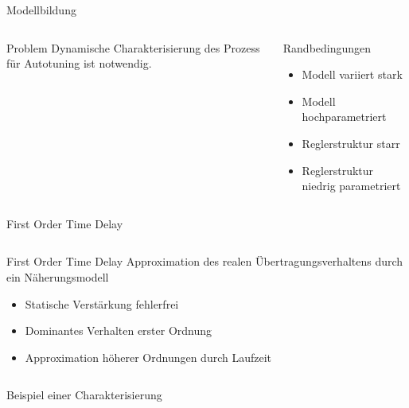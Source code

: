 \documentclass[fleqn,11pt,aspectratio=43]{beamer}
\begin{document}
\begin{frame}{Modellbildung}
\begin{columns}[onlytextwidth]
    	\resizebox{\columnwidth}{!}{}
	\begin{alertblock}{Problem}
		Dynamische Charakterisierung des Prozess für Autotuning ist notwendig.
	\end{alertblock}
	\begin{exampleblock}{Randbedingungen}
		\begin{itemize}
			\item Modell variiert stark
			\item Modell hochparametriert
			\item Reglerstruktur starr
			\item Reglerstruktur niedrig parametriert
		\end{itemize}
	\end{exampleblock}
  \end{columns}
\end{frame}

\begin{frame}{First Order Time Delay}
\begin{columns}[onlytextwidth]
	\centering
	\resizebox{\columnwidth}{!}{}
	\begin{exampleblock}{First Order Time Delay}
	Approximation des realen Übertragungsverhaltens durch ein Näherungsmodell
	\begin{itemize}
		\item Statische Verstärkung fehlerfrei
		\item Dominantes Verhalten erster Ordnung
		\item Approximation höherer Ordnungen durch Laufzeit
	\end{itemize}
	\end{exampleblock}
\end{columns}
\end{frame}

\begin{frame}{Beispiel einer Charakterisierung}
\centering\resizebox{\textwidth}{!}{}
\end{frame}


\end{document}
